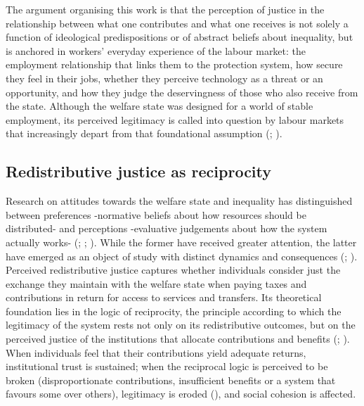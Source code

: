\documentclass[
  12pt,
]{article}
\begin{document}
The argument organising this work is that the perception of justice in
the relationship between what one contributes and what one receives is
not solely a function of ideological predispositions or of abstract
beliefs about inequality, but is anchored in workers' everyday
experience of the labour market: the employment relationship that links
them to the protection system, how secure they feel in their jobs,
whether they perceive technology as a threat or an opportunity, and how
they judge the deservingness of those who also receive from the state.
Although the welfare state was designed for a world of stable
employment, its perceived legitimacy is called into question by labour
markets that increasingly depart from that foundational assumption
(;
).

\subsection{Redistributive justice as
reciprocity}\label{redistributive-justice-as-reciprocity}

Research on attitudes towards the welfare state and inequality has
distinguished between preferences -normative beliefs about how resources
should be distributed- and perceptions -evaluative judgements about how
the system actually works-
(;
;
). While the
former have received greater attention, the latter have emerged as an
object of study with distinct dynamics and consequences
(;
). Perceived
redistributive justice captures whether individuals consider just the
exchange they maintain with the welfare state when paying taxes and
contributions in return for access to services and transfers. Its
theoretical foundation lies in the logic of reciprocity, the principle
according to which the legitimacy of the system rests not only on its
redistributive outcomes, but on the perceived justice of the
institutions that allocate contributions and benefits
(;
). When individuals
feel that their contributions yield adequate returns, institutional
trust is sustained; when the reciprocal logic is perceived to be broken
(disproportionate contributions, insufficient benefits or a system that
favours some over others), legitimacy is eroded
(), and social cohesion
is affected.
\end{document}
